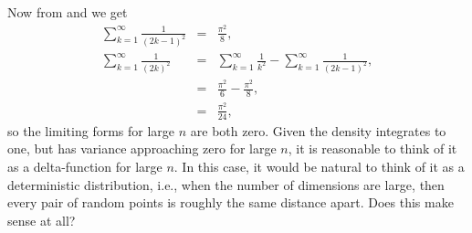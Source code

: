 Now from \cite[0.234,2.(p.7)]{GandR} and \cite[0.233,3.(p.7)]{GandR}  we get
\begin{eqnarray}
  \sum_{k=1}^{\infty} \frac{1}{(2k-1)^2} & = & \frac{\pi^2}{8},  \\
  \sum_{k=1}^{\infty} \frac{1}{(2k)^2}
           & = &  \sum_{k=1}^{\infty} \frac{1}{k^2} - \sum_{k=1}^{\infty} \frac{1}{(2k-1)^2}, \nonumber \\
           & = & \frac{\pi^2}{6}  - \frac{\pi^2}{8}  , \nonumber \\
           & = & \frac{\pi^2}{24} ,
\end{eqnarray}
so the limiting forms for large $n$ are both zero. Given the density
integrates to one, but has variance approaching zero for large $n$, it
is reasonable to think of it as a delta-function for large $n$. In
this case, it would be natural to think of it as a deterministic
distribution, i.e., when the number of dimensions are large, then
every pair of random points is roughly the same distance apart. Does
this make sense at all?

%   



